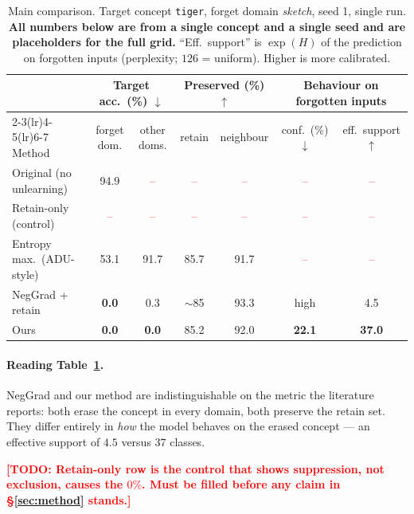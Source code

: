\documentclass[10pt]{article}
\newcommand{\todo}[1]{\textcolor{red}{\textbf{[TODO: #1]}}}
\newcommand{\pending}{\textcolor{red}{--}}
\begin{document}
\begin{table}[t]
\centering
\caption{Main comparison. Target concept \texttt{tiger}, forget domain
\emph{sketch}, seed 1, single run. \textbf{All numbers below are from a single
concept and a single seed and are placeholders for the full grid.}
``Eff.\ support'' is $\exp(H)$ of the prediction on forgotten inputs (perplexity;
$126$ = uniform). Higher is more calibrated.}
\label{tab:main}
\small
\begin{tabular}{lcccccc}
\toprule
& \multicolumn{2}{c}{Target acc.\ (\%) $\downarrow$}
& \multicolumn{2}{c}{Preserved (\%) $\uparrow$}
& \multicolumn{2}{c}{Behaviour on forgotten inputs} \\
\cmidrule(lr){2-3}\cmidrule(lr){4-5}\cmidrule(lr){6-7}
Method & forget dom. & other doms. & retain & neighbour
& conf.\ (\%) $\downarrow$ & eff.\ support $\uparrow$ \\
\midrule
Original (no unlearning)      & 94.9 & \pending & \pending & \pending & \pending & \pending \\
Retain-only (control)         & \pending & \pending & \pending & \pending & \pending & \pending \\
Entropy max.\ (ADU-style)     & 53.1 & 91.7 & 85.7 & 91.7 & \pending & \pending \\
NegGrad + retain              & \textbf{0.0} & 0.3 & $\sim$85 & 93.3 & high & 4.5 \\
\midrule
Ours                          & \textbf{0.0} & \textbf{0.0} & 85.2 & 92.0
                              & \textbf{22.1} & \textbf{37.0} \\
\bottomrule
\end{tabular}
\end{table}

\paragraph{Reading Table~\ref{tab:main}.} NegGrad and our method are
indistinguishable on the metric the literature reports: both erase the concept in
every domain, both preserve the retain set. They differ entirely in
\emph{how} the model behaves on the erased concept --- an effective support of
$4.5$ versus $37$ classes.

\todo{Retain-only row is the control that shows suppression, not exclusion,
causes the $0\%$. Must be filled before any claim in \S\ref{sec:method} stands.}
\end{document}
